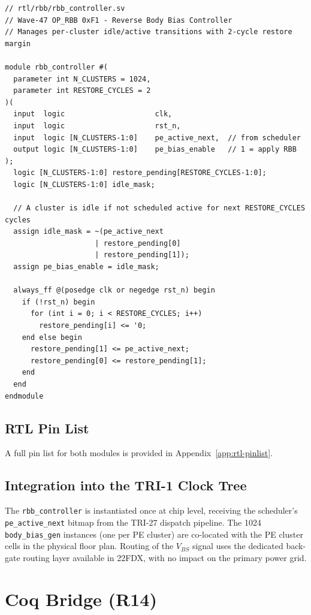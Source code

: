 \begin{verbatim}
// rtl/rbb/rbb_controller.sv
// Wave-47 OP_RBB 0xF1 - Reverse Body Bias Controller
// Manages per-cluster idle/active transitions with 2-cycle restore margin

module rbb_controller #(
  parameter int N_CLUSTERS = 1024,
  parameter int RESTORE_CYCLES = 2
)(
  input  logic                     clk,
  input  logic                     rst_n,
  input  logic [N_CLUSTERS-1:0]    pe_active_next,  // from scheduler
  output logic [N_CLUSTERS-1:0]    pe_bias_enable   // 1 = apply RBB
);
  logic [N_CLUSTERS-1:0] restore_pending[RESTORE_CYCLES-1:0];
  logic [N_CLUSTERS-1:0] idle_mask;

  // A cluster is idle if not scheduled active for next RESTORE_CYCLES cycles
  assign idle_mask = ~(pe_active_next
                     | restore_pending[0]
                     | restore_pending[1]);
  assign pe_bias_enable = idle_mask;

  always_ff @(posedge clk or negedge rst_n) begin
    if (!rst_n) begin
      for (int i = 0; i < RESTORE_CYCLES; i++)
        restore_pending[i] <= '0;
    end else begin
      restore_pending[1] <= pe_active_next;
      restore_pending[0] <= restore_pending[1];
    end
  end
endmodule
\end{verbatim}

\subsection{RTL Pin List}

A full pin list for both modules is provided in Appendix~\ref{app:rtl-pinlist}.

\subsection{Integration into the TRI-1 Clock Tree}

The \texttt{rbb\_controller} is instantiated once at chip level, receiving the
scheduler's \texttt{pe\_active\_next} bitmap from the TRI-27 dispatch pipeline.
The 1024 \texttt{body\_bias\_gen} instances (one per PE cluster) are
co-located with the PE cluster cells in the physical floor plan.
Routing of the $V_{BS}$ signal uses the dedicated back-gate routing layer
available in 22FDX, with no impact on the primary power grid.

\section{Coq Bridge (R14)}
\label{sec:coq-bridge-w47}

